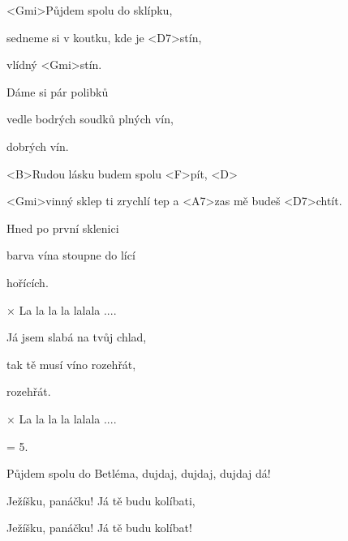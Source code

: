 

\zs
<Gmi>Půjdem spolu do sklípku,

sedneme si v koutku, kde je <D7>stín,

vlídný <Gmi>stín.
\ks

\zs
Dáme si pár polibků

vedle bodrých soudků plných vín,

dobrých vín.
\ks

\zr
<B>Rudou lásku budem spolu <F>pít, <D>

<Gmi>vinný sklep ti zrychlí tep a <A7>zas mě budeš <D7>chtít.
\kr

\zs
Hned po první sklenici

barva vína stoupne do lící

hořících.
\ks

× La la la la lalala ....
\ks

\zr
\kr

\zs
Já jsem slabá na tvůj chlad,

tak tě musí víno rozehřát,

rozehřát.
\ks

× La la la la lalala ....
\ks

\zr
\kr

\zs
= 5.
\ks

\zs
Půjdem spolu do Betléma, dujdaj, dujdaj, dujdaj dá! 

Ježíšku, panáčku! Já tě budu kolíbati, 

Ježíšku, panáčku! Já tě budu kolíbat! 
\ks 

\kp
